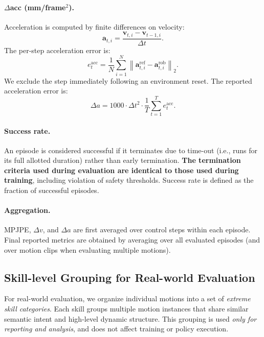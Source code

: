 \paragraph{$\Delta$acc (mm/frame$^2$).}
Acceleration is computed by finite differences on velocity:
\[
\mathbf{a}_{t,i} =
\frac{\mathbf{v}_{t,i} - \mathbf{v}_{t-1,i}}{\Delta t}.
\]
The per-step acceleration error is:
\begin{equation}
e^{\text{acc}}_t =
\frac{1}{N} \sum_{i=1}^{N}
\left\|
\mathbf{a}^{\text{ref}}_{t,i} -
\mathbf{a}^{\text{rob}}_{t,i}
\right\|_2.
\end{equation}
We exclude the step immediately following an environment reset.
The reported acceleration error is:
\begin{equation}
\Delta a =
1000 \cdot \Delta t^2 \cdot \frac{1}{T} \sum_{t=1}^{T} e^{\text{acc}}_t.
\end{equation}

\paragraph{Success rate.}
An episode is considered successful if it terminates due to time-out
(i.e., runs for its full allotted duration) rather than early termination.
\textbf{The termination criteria used during evaluation are identical to those used during training},
including violation of safety thresholds.
Success rate is defined as the fraction of successful episodes.

\paragraph{Aggregation.}
MPJPE, $\Delta v$, and $\Delta a$ are first averaged over control steps within each episode.
Final reported metrics are obtained by averaging over all evaluated episodes
(and over motion clips when evaluating multiple motions).

\subsection{Skill-level Grouping for Real-world Evaluation}
\label{sec:supp_skills}

For real-world evaluation, we organize individual motions into a set of
\emph{extreme skill categories}.
Each skill groups multiple motion instances that share similar
semantic intent and high-level dynamic structure.
This grouping is used \emph{only for reporting and analysis}, and does not
affect training or policy execution.

